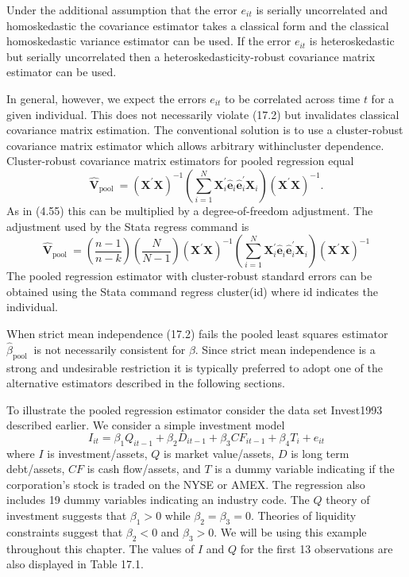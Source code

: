 \documentclass[10pt]{article}
\begin{document}
Under the additional assumption that the error $e_{i t}$ is serially uncorrelated and homoskedastic the covariance estimator takes a classical form and the classical homoskedastic variance estimator can be used. If the error $e_{i t}$ is heteroskedastic but serially uncorrelated then a heteroskedasticity-robust covariance matrix estimator can be used.

In general, however, we expect the errors $e_{i t}$ to be correlated across time $t$ for a given individual. This does not necessarily violate (17.2) but invalidates classical covariance matrix estimation. The conventional solution is to use a cluster-robust covariance matrix estimator which allows arbitrary withincluster dependence. Cluster-robust covariance matrix estimators for pooled regression equal
$$
\widehat{\boldsymbol{V}}_{\text {pool }}=\left(\boldsymbol{X}^{\prime} \boldsymbol{X}\right)^{-1}\left(\sum_{i=1}^{N} \boldsymbol{X}_{i}^{\prime} \widehat{\boldsymbol{e}}_{i} \widehat{\boldsymbol{e}}_{i}^{\prime} \boldsymbol{X}_{i}\right)\left(\boldsymbol{X}^{\prime} \boldsymbol{X}\right)^{-1} .
$$
As in (4.55) this can be multiplied by a degree-of-freedom adjustment. The adjustment used by the Stata regress command is
$$
\widehat{\boldsymbol{V}}_{\text {pool }}=\left(\frac{n-1}{n-k}\right)\left(\frac{N}{N-1}\right)\left(\boldsymbol{X}^{\prime} \boldsymbol{X}\right)^{-1}\left(\sum_{i=1}^{N} \boldsymbol{X}_{i}^{\prime} \widehat{\boldsymbol{e}}_{i} \widehat{\boldsymbol{e}}_{i}^{\prime} \boldsymbol{X}_{i}\right)\left(\boldsymbol{X}^{\prime} \boldsymbol{X}\right)^{-1}
$$
The pooled regression estimator with cluster-robust standard errors can be obtained using the Stata command regress cluster(id) where id indicates the individual.

When strict mean independence (17.2) fails the pooled least squares estimator $\widehat{\beta}_{\text {pool }}$ is not necessarily consistent for $\beta$. Since strict mean independence is a strong and undesirable restriction it is typically preferred to adopt one of the alternative estimators described in the following sections.

To illustrate the pooled regression estimator consider the data set Invest1993 described earlier. We consider a simple investment model
$$
I_{i t}=\beta_{1} Q_{i t-1}+\beta_{2} D_{i t-1}+\beta_{3} C F_{i t-1}+\beta_{4} T_{i}+e_{i t}
$$
where $I$ is investment/assets, $Q$ is market value/assets, $D$ is long term debt/assets, $C F$ is cash flow/assets, and $T$ is a dummy variable indicating if the corporation's stock is traded on the NYSE or AMEX. The regression also includes 19 dummy variables indicating an industry code. The $Q$ theory of investment suggests that $\beta_{1}>0$ while $\beta_{2}=\beta_{3}=0$. Theories of liquidity constraints suggest that $\beta_{2}<0$ and $\beta_{3}>0$. We will be using this example throughout this chapter. The values of $I$ and $Q$ for the first 13 observations are also displayed in Table 17.1.
\end{document}
